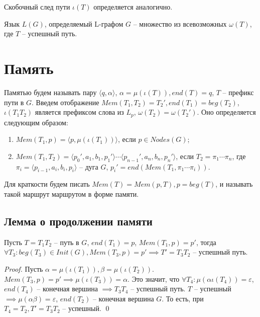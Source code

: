 Скобочный след пути $\iota(T)$ определяется аналогично.

Язык $L(G)$, определяемый L-графом $G$ -- множество из всевозможных $\omega(T)$, где $T$ -- успешный путь.

\section{Память}
Памятью будем называть пару $\langle q, \alpha \rangle$, $\alpha=\mu(\iota(T)), end(T)=q$, $T$ --  префикс пути в $G$. 
Введем отображение $Mem(T_1,T_2) = T_2', end(T_1) = beg(T_2)$, $\iota(T_1 T_2)$ является префиксом слова из $L_p$, $\omega(T_2) = \omega(T_2')$.
Оно определяется следующим образом:
\begin{enumerate}
    \item $Mem(T_1, p) = \langle p, \mu(\iota(T_1)) \rangle$, если $p \in Nodes(G)$;
    \item {
        $Mem(T_1, T_2) = \langle p_0', a_1, b_1, p_1' \rangle \cdots \langle p_{n-1}', a_n, b_n, p_n' \rangle$, если $T_2 =\pi_1 \cdots \pi_n$, 
        где $\pi_i = \langle p_{i-1}, a_i, b_i, p_i \rangle$ -- дуга $G$, $p_i' = end(Mem(T_1, \pi_1 \cdots \pi_i))$.
    }
\end{enumerate}

Для краткости будем писать $Mem(T) = Mem(p, T), p = beg(T)$, и называть такой маршрут маршрутом в форме памяти. 

\subsection*{Лемма о продолжении памяти}
\begin{lemma}
    \label{mem_continue_lemma}
    Пусть $T=T_1 T_2$ -- путь в $G$, $end(T_1) = p$, $Mem(T_1, p) = p'$, тогда $\forall T_3 : beg(T_3) \in Init(G), Mem(T_3, p) = p' \implies T' = T_3 T_2$ -- успешный путь. 
\end{lemma}
\begin{proof}
    Пусть $\alpha = \mu(\iota(T_1)), \beta = \mu(\iota(T_2))$.
    $Mem(T_3, p) = p' \implies \mu(\iota(T_3)) = \alpha$.
    Это значит, что $\forall T_4 : \mu(\alpha \iota(T_4)) = \varepsilon$, $end(T_4)$ -- конечная вершина  $\implies T_3 T_4$ -- успешный путь.
    $T$ -- успешный $\implies \mu(\alpha \beta) = \varepsilon$, $end(T_2)$ -- конечная вершина $G$. 
    То есть, при $T_4 = T_2, T' = T_3 T_2$ -- успешный. \qed

    
\end{proof}

